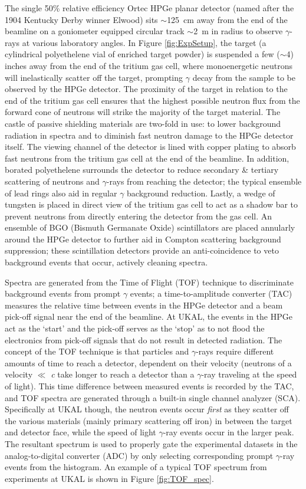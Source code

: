 The single 50\% relative efficiency Ortec HPGe planar detector (named after the 1904 Kentucky Derby winner Elwood) sits $\sim$125~cm away from the end of the beamline on a goniometer equipped circular track $\sim$2~m in radius to observe $\gamma$-rays at various laboratory angles. In Figure \ref{fig:ExpSetup}, the target (a cylindrical polyethelene vial of enriched target powder) is suspended a few ($\sim$4) inches away from the end of the tritium gas cell, where monoenergetic neutrons will inelastically scatter off the target, prompting $\gamma$ decay from the sample to be observed by the HPGe detector. The proximity of the target in relation to the end of the tritium gas cell ensures that the highest possible neutron flux from the forward cone of neutrons will strike the majority of the target material. The castle of passive shielding materials are two-fold in use: to lower background radiation in spectra and to diminish fast neutron damage to the HPGe detector itself. The viewing channel of the detector is lined with copper plating to absorb fast neutrons from the tritium gas cell at the end of the beamline. In addition, borated polyethelene surrounds the detector to reduce secondary \& tertiary scattering of neutrons and $\gamma$-rays from reaching the detector; the typical ensemble of lead rings also aid in regular $\gamma$ background reduction. Lastly, a wedge of tungsten is placed in direct view of the tritium gas cell to act as a shadow bar to prevent neutrons from directly entering the detector from the gas cell. An ensemble of BGO (Bismuth Germanate Oxide) scintillators are placed annularly around the HPGe detector to further aid in Compton scattering background suppression; these scintillation detectors provide an anti-coincidence to veto background events that occur, actively cleaning spectra.

Spectra are generated from the Time of Flight (TOF) technique to discriminate background events from prompt $\gamma$ events; a time-to-amplitude converter (TAC) measures the relative time between events in the HPGe detector and a beam pick-off signal near the end of the beamline. At UKAL, the events in the HPGe act as the `start' and the pick-off serves as the `stop' as to not flood the electronics from pick-off signals that do not result in detected radiation. The concept of the TOF technique is that particles and $\gamma$-rays require different amounts of time to reach a detector, dependent on their velocity (neutrons of a velocity $\ll$ \textit{c} take longer to reach a detector than a $\gamma$-ray traveling at the speed of light). This time difference between measured events is recorded by the TAC, and TOF spectra are generated through a built-in single channel analyzer (SCA). Specifically at UKAL though, the neutron events occur \textit{first} as they scatter off the various materials (mainly primary scattering off iron) in between the target and detector face, while the speed of light $\gamma$-ray events occur in the larger peak. The resultant spectrum is used to properly gate the experimental datasets in the analog-to-digital converter (ADC) by only selecting corresponding prompt $\gamma$-ray events from the histogram. An example of a typical TOF spectrum from experiments at UKAL is shown in Figure \ref{fig:TOF_spec}.

